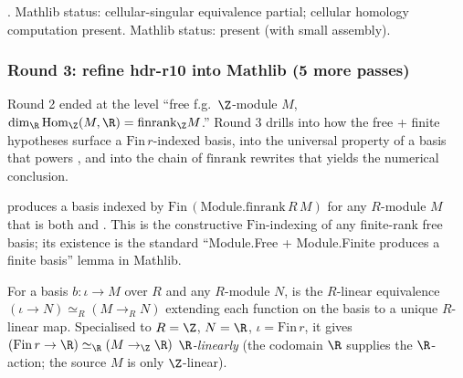 \begin{lemma}
\label{lem:hdf-r15}
.  Mathlib status: cellular-singular equivalence partial; cellular homology computation present.  Mathlib status: present (with small assembly).
\leanok\mathlibok
\end{lemma}

\subsubsection*{Round 3: refine hdr-r10 into Mathlib (5 more passes)}

Round 2 ended at the level ``free f.g.\ $\Z$-module $M$, $\dim_\R \mathrm{Hom}_\Z(M,\R) = \mathrm{finrank}_\Z M$.''  Round 3 drills into how the free + finite hypotheses surface a $\mathrm{Fin}\,r$-indexed basis, into the universal property of a basis that powers , and into the chain of $\mathrm{finrank}$ rewrites that yields the numerical conclusion.

\begin{lemma}
\label{lem:hdr-r11}
 produces a basis indexed by $\mathrm{Fin}\,(\mathrm{Module.finrank}\,R\,M)$ for any $R$-module $M$ that is both  and .  This is the constructive $\mathrm{Fin}$-indexing of any finite-rank free basis; its existence is the standard ``Module.Free + Module.Finite produces a finite basis'' lemma in Mathlib.
\leanok\mathlibok
\end{lemma}

\begin{lemma}
\label{lem:hdr-r12}
For a basis $b : \iota \to M$ over $R$ and any $R$-module $N$,  is the $R$-linear equivalence $(\iota \to N) \simeq_R (M \to_R N)$ extending each function on the basis to a unique $R$-linear map.  Specialised to $R = \Z$, $N = \R$, $\iota = \mathrm{Fin}\,r$, it gives $(\mathrm{Fin}\,r \to \R) \simeq_\R (M \to_\Z \R)$ \emph{$\R$-linearly} (the codomain $\R$ supplies the $\R$-action; the source $M$ is only $\Z$-linear).
\leanok\mathlibok
\end{lemma}

